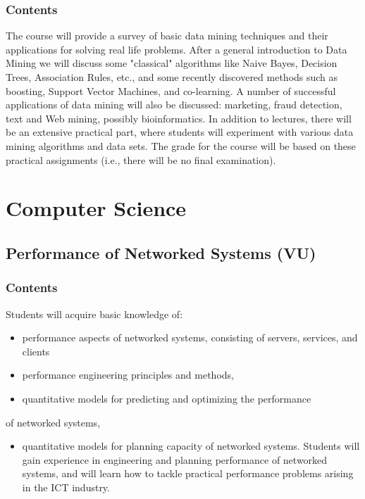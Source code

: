 \documentclass[11pt]{article}
\begin{document}
\subsubsection{Contents}
\label{sec:org78ef43c}

The course will provide a survey of basic data mining techniques and their
applications for solving real life problems. After a general introduction to
Data Mining we will discuss some "classical" algorithms like Naive Bayes,
Decision Trees, Association Rules, etc., and some recently discovered methods
such as boosting, Support Vector Machines, and co-learning. A number of
successful applications of data mining will also be discussed: marketing, fraud
detection, text and Web mining, possibly bioinformatics. In addition to
lectures, there will be an extensive practical part, where students will
experiment with various data mining algorithms and data sets. The grade for the
course will be based on these practical assignments (i.e., there will be no
final examination).

\section{Computer Science}
\label{sec:org0c8bd2b}

\subsection{Performance of Networked Systems (VU)}
\label{sec:orgaef3109}

\subsubsection{Contents}
\label{sec:orgb51a843}

Students will acquire basic knowledge of:
\begin{itemize}
\item performance aspects of networked systems, consisting of servers, services, and
clients
\item performance engineering principles and methods,
\item quantitative models for predicting and optimizing the performance
\end{itemize}
of networked systems,
\begin{itemize}
\item quantitative models for planning capacity of networked systems. Students will
gain experience in engineering and planning performance of networked systems,
and will learn how to tackle practical performance problems arising in the ICT
industry.
\end{itemize}
\end{document}
